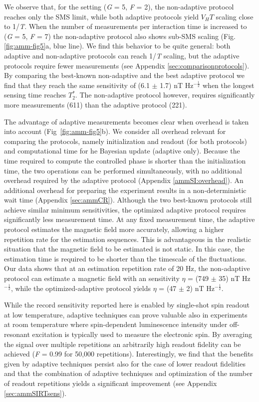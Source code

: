 We observe that, for the setting (\textit{G} = 5, \textit{F} = 2), the non-adaptive protocol reaches only the SMS limit, while both adaptive protocols yield $V_H T$ scaling close to 1/\textit{T}. When the number of measurements per interaction time is increased to (\textit{G} = 5, \textit{F} = 7) the non-adaptive protocol also shows sub-SMS scaling (Fig.\,\ref{fig:amm-fig5}a, blue line). We find this behavior to be quite general: both adaptive and non-adaptive protocols can reach 1/\textit{T} scaling, but the adaptive protocols require fewer measurements (see Appendix \ref{sec:comparisonprotocols}). By comparing the best-known non-adaptive and the best adaptive protocol we find that they reach the same sensitivity of (6.1 $\pm$ 1.7) nT Hz$^{-\frac{1}{2}}$ when the longest sensing time reaches $T_2^*$. The non-adaptive protocol however, requires significantly more measurements (611) than the adaptive protocol (221).

The advantage of adaptive measurements becomes clear when overhead is taken into account (Fig \,\ref{fig:amm-fig5}b). We consider all overhead relevant for comparing the protocols, namely initialization and readout (for both protocols) and computational time for he Bayesian update (adaptive only). Because the time required to compute the controlled phase is shorter than the initialization time, the two operations can be performed simultaneously, with no additional overhead required by the adaptive protocol (Appendix \ref{ammSI:overhead}). An additional overhead for preparing the experiment results in a non-deterministic wait time (Appendix \ref{sec:ammCR}). Although the two best-known protocols still achieve similar minimum sensitivities, the optimized adaptive protocol requires significantly less measurement time. At any fixed measurement time, the adaptive protocol estimates the magnetic field more accurately, allowing a higher repetition rate for the estimation sequences. This is advantageous in the realistic situation that the magnetic field to be estimated is not static. In this case, the estimation time is required to be shorter than the timescale of the fluctuations. Our data shows that at an estimation repetition rate of 20 Hz, the non-adaptive protocol can estimate a magnetic field with an sensitivity $\eta$ = (749 $\pm$ 35) nT Hz$^{-\frac{1}{2}}$, while the optimized-adaptive protocol yields $\eta$ = (47 $\pm$ 2) nT Hz$^{-\frac{1}{2}}$.

While the record sensitivity reported here is enabled by single-shot spin readout at low temperature, adaptive techniques can prove valuable also in experiments at room temperature\cite{Nusran_NatNano_2012} where spin-dependent luminescence intensity under off-resonant excitation is typically used to measure the electronic spin. By averaging the signal over multiple repetitions an arbitrarily high readout fidelity can be achieved (\textit{F} = 0.99 for 50,000 repetitions\cite{Nusran_NatNano_2012}). Interestingly, we find that the benefits given by adaptive techniques persist also for the case of lower readout fidelities and that the combination of adaptive techniques and optimization of the number of readout repetitions yields a significant improvement (see Appendix \ref{sec:ammSIRTsens}).

